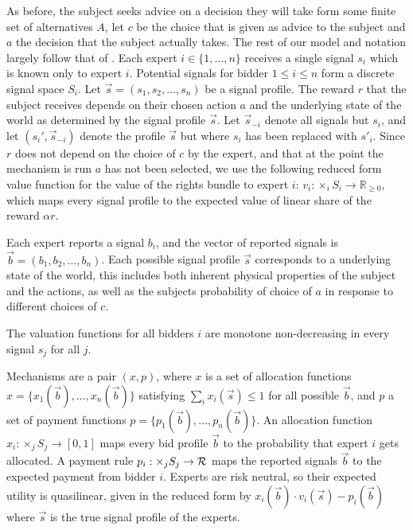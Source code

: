 As before, the subject seeks advice on a decision they will take form some finite set of alternatives $A$, let $c$ be the choice that is given as advice to the subject and $a$ the decision that the subject actually takes.
The rest of our model and notation largely follow that of \cite{eden2018interdependent}.%
Each expert $i \in \{1, \ldots, n\}$ receives a single signal $s_i$ which is known only to expert $i$.
Potential signals for bidder $1 \leq i\leq n$ form a discrete signal space $S_i$.
Let $\vec{s}=(s_1,s_2,\ldots,s_n)$ be a signal profile.
The reward $r$ that the subject receives depends on their chosen action $a$ and the underlying state of the world as determined by the signal profile $\vec{s}$.
Let $\vec{s}_{-i}$ denote all signals but $s_i$, and let $(s_i',\vec{s}_{-i})$ denote the profile $\vec{s}$ but where $s_i$ has been replaced with $s'_i$. 
Since $r$ does not depend on the choice of $c$ by the expert, and that at the point the mechanism is run $a$ has not been selected, we use the following reduced form  value function for the value of the rights bundle to expert $i$: $v_i: \times_i S_i \rightarrow \mathbb{R}_{\geq 0}$, which maps every signal profile to the expected value of linear share of the reward  $\alpha r$.


Each expert reports a signal $b_i$, and the vector of reported signals is $\vec{b}=( b_1, b_2, \ldots, b_n)$.
Each possible signal profile $\vec{s}$ corresponds to a underlying state of the world, this includes both inherent physical properties of the subject and the actions, as well as the subjects probability of choice of $a$ in response to different choices of $c$.


The valuation functions for all bidders $i$ are monotone non-decreasing in every signal $s_j$ for all $j$.%

Mechanisms are a pair $(x,p)$, where $x$ is a set of allocation functions $x=\{x_1(\vec{b}),\ldots,x_n(\vec{b})\}$ satisfying $\sum_i x_i(\vec{s}) \leq 1$ for all possible $\vec{b}$, and $p$ a set of payment functions  $p=\{p_1(\vec{b}),\ldots,p_n(\vec{b})\}$.
An allocation function $x_i:\times_j S_j\rightarrow [0,1]$ maps every bid profile $\vec{b}$ to the probability that expert $i$ gets allocated.
A payment rule $p_i: \times _j S_j \rightarrow {\mathcal R}$ maps the reported signals $\vec{b}$ to the expected payment from bidder $i$. Experts are risk neutral, so their expected utility is quasilinear, given in the reduced form by $x_i (\vec{b}) \cdot v_i(\vec{s}) - p_i(\vec{b})$ where $\vec{s}$ is the true signal profile of the experts.


